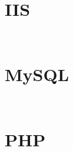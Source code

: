 \begin{lstlisting}[language=bash]

\end{lstlisting}


\section{IIS}



\begin{lstlisting}[language=bash]

\end{lstlisting}



\begin{lstlisting}[language=bash]

\end{lstlisting}


\section{MySQL}



\begin{lstlisting}[language=bash]

\end{lstlisting}



\begin{lstlisting}[language=bash]

\end{lstlisting}


\section{PHP}



\begin{lstlisting}[language=bash]

\end{lstlisting}



\begin{lstlisting}[language=bash]

\end{lstlisting}





\begin{lstlisting}[language=bash]

\end{lstlisting}



